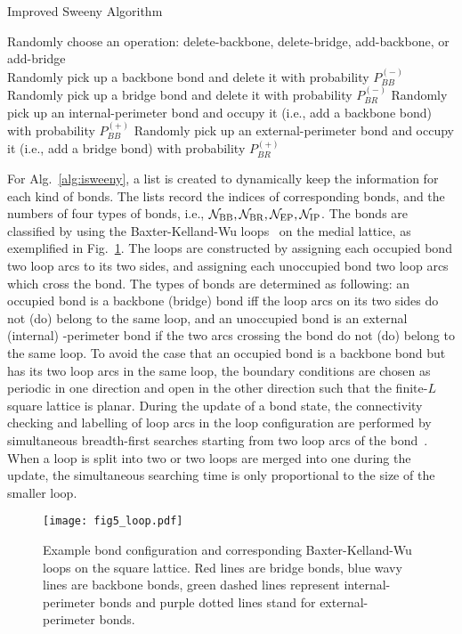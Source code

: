 \documentclass[aps,pre,twocolumn,superscriptaddress,longbibliography,floatfix]{revtex4-2}
\begin{document}
\begin{algorithm}[b]
\caption{Improved Sweeny Algorithm}
\label{alg:isweeny}
 Randomly choose an operation:
 {\sffamily delete-backbone}, {\sffamily delete-bridge}, {\sffamily add-backbone}, or {\sffamily  add-bridge}\\
{Randomly pick up a backbone bond and delete it with probability $P^{(-)}_{BB}$}
{Randomly pick up a bridge bond and delete it with probability $P^{(-)}_{BR}$}
{Randomly pick up an internal-perimeter bond and occupy it (i.e., add a backbone bond) with probability $P^{(+)}_{BB}$}
 {Randomly pick up an external-perimeter bond and occupy it (i.e., add a bridge bond) with probability $P^{(+)}_{BR}$}
\end{algorithm}
\medskip

For Alg.~\ref{alg:isweeny}, a list is created to dynamically keep the information for each kind of bonds.
The lists record the indices of corresponding bonds, and the numbers of four types of bonds, i.e., $\mathcal{N}_{\rm BB},\mathcal{N}_{\rm BR},\mathcal{N}_{\rm EP},\mathcal{N}_{\rm IP}$.
The bonds are classified by using the Baxter-Kelland-Wu loops~\cite{baxter1976equivalence} on the medial lattice, as exemplified in Fig.~\ref{loop}. 
The loops are constructed by assigning each occupied bond two loop arcs to its two sides, and assigning each unoccupied bond two loop arcs which cross the bond.
The types of bonds are determined as following:
an occupied bond is a backbone (bridge) bond iff the loop arcs on its two sides do not (do) belong to the same loop, and an unoccupied bond is an external (internal) -perimeter bond if the two arcs crossing the bond do not (do) belong to the same loop. To avoid the case that an occupied bond is a backbone bond but has its two loop arcs in the same loop, the boundary conditions are chosen as periodic in one direction and open in the other direction such that the finite-$L$ square lattice is planar.
During the update of a bond state, the connectivity checking and labelling of loop arcs in the loop configuration are performed 
by simultaneous breadth-first searches starting from two loop arcs of the bond~\cite{deng2010some,elcci2013efficient}. 
When a loop is split into two or two loops are merged into one during the update, the simultaneous searching time is only proportional to the size of the smaller loop.

\begin{figure}[t]
\centering
\texttt{[image: fig5\_loop.pdf]}
\caption{Example bond configuration and corresponding Baxter-Kelland-Wu loops on the square lattice. Red lines are bridge bonds, blue wavy lines are backbone bonds, green dashed lines represent internal-perimeter bonds and purple dotted lines stand for external-perimeter bonds.} 
\label{loop}
\end{figure}
\end{document}
